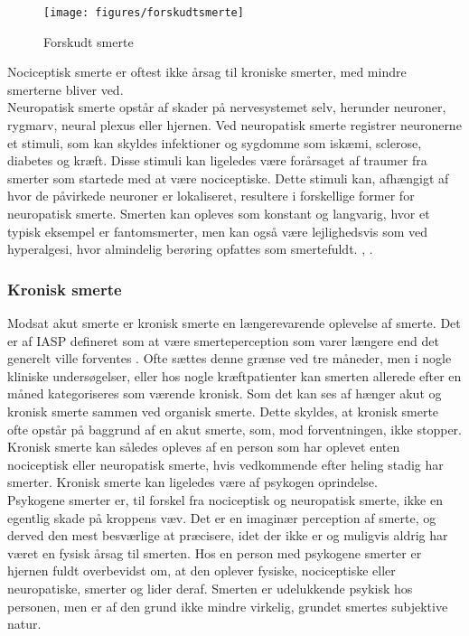 {{\begin{figure}[H]
\begin{center}
\texttt{[image: figures/forskudtsmerte]}
	\caption{Forskudt smerte \citep{Martini}}
	\label{forskudtsmerte}
\end{center}
\end{figure}


Nociceptisk smerte er oftest ikke årsag til kroniske smerter, med mindre smerterne bliver ved.\\ 
Neuropatisk smerte opstår af skader på nervesystemet selv, herunder neuroner, rygmarv, neural plexus eller hjernen. 
Ved neuropatisk smerte registrer neuronerne et stimuli, som kan skyldes infektioner og sygdomme som iskæmi, sclerose, diabetes og kræft. Disse stimuli kan ligeledes være forårsaget af traumer fra smerter som startede med at være nociceptiske. Dette stimuli kan, afhængigt af hvor de påvirkede neuroner er lokaliseret, resultere i forskellige former for neuropatisk smerte. Smerten kan opleves som konstant og langvarig, hvor et typisk eksempel er fantomsmerter, men kan også være lejlighedsvis som ved hyperalgesi, hvor almindelig berøring opfattes som smertefuldt. \citep{Giangregorio1997}, \citep{Carmon}.

\subsubsection{Kronisk smerte}
Modsat akut smerte er kronisk smerte en længerevarende oplevelse af smerte. Det er af IASP defineret som at være smerteperception som varer længere end det generelt ville forventes \citep{Carmon}. Ofte sættes denne grænse ved tre måneder, men i nogle kliniske undersøgelser, eller hos nogle kræftpatienter kan smerten allerede efter en måned kategoriseres som værende kronisk. Som det kan ses af  hænger akut og kronisk smerte sammen ved organisk smerte. Dette skyldes, at kronisk smerte ofte opstår på baggrund af en akut smerte, som, mod forventningen, ikke stopper. Kronisk smerte kan således opleves af en person som har oplevet enten nociceptisk eller neuropatisk smerte, hvis vedkommende efter heling stadig har smerter. Kronisk smerte kan ligeledes være af psykogen oprindelse.\\
Psykogene smerter er, til forskel fra nociceptisk og neuropatisk smerte, ikke en egentlig skade på kroppens væv. Det er en imaginær perception af smerte, og derved den mest besværlige at præcisere, idet der ikke er og muligvis aldrig har været en fysisk årsag til smerten. Hos en person med psykogene smerter er hjernen fuldt overbevidst om, at den oplever fysiske, nociceptiske eller neuropatiske, smerter og lider deraf. Smerten er udelukkende psykisk hos personen, men er af den grund ikke mindre virkelig, grundet smertes subjektive natur. \citep{Giangregorio1997}

}}
